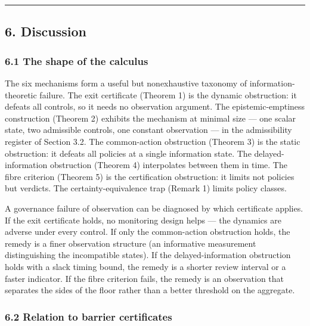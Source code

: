 \documentclass[11pt]{article}
\begin{document}
\begin{center}\rule{0.5\linewidth}{0.5pt}\end{center}

\subsection{6. Discussion}\label{discussion}

\subsubsection{6.1 The shape of the
calculus}\label{the-shape-of-the-calculus}

The six mechanisms form a useful but nonexhaustive taxonomy of
information-theoretic failure. The exit certificate (Theorem 1) is the
dynamic obstruction: it defeats all controls, so it needs no observation
argument. The epistemic-emptiness construction (Theorem 2) exhibits the
mechanism at minimal size --- one scalar state, two admissible controls,
one constant observation --- in the admissibility register of Section
3.2. The common-action obstruction (Theorem 3) is the static
obstruction: it defeats all policies at a single information state. The
delayed-information obstruction (Theorem 4) interpolates between them in
time. The fibre criterion (Theorem 5) is the certification obstruction:
it limits not policies but verdicts. The certainty-equivalence trap
(Remark 1) limits policy classes.

A governance failure of observation can be diagnosed by which
certificate applies. If the exit certificate holds, no monitoring design
helps --- the dynamics are adverse under every control. If only the
common-action obstruction holds, the remedy is a finer observation
structure (an informative measurement distinguishing the incompatible
states). If the delayed-information obstruction holds with a slack
timing bound, the remedy is a shorter review interval or a faster
indicator. If the fibre criterion fails, the remedy is an observation
that separates the sides of the floor rather than a better threshold on
the aggregate.

\subsubsection{6.2 Relation to barrier
certificates}\label{relation-to-barrier-certificates}
\end{document}

